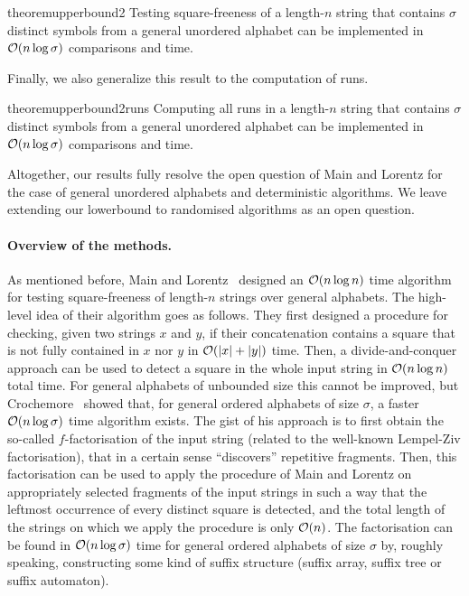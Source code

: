 \begin{restatable}{theorem}{upperbound2}
\label{thm:upperbound2}
Testing square-freeness of a length-$n$ string that contains $\sigma$ distinct symbols from a general unordered alphabet can be implemented in $\mathcal{O}(n\log \sigma)$ comparisons
and time.
\end{restatable}

Finally, we also generalize this result to the computation of runs.

\begin{restatable}{theorem}{upperbound2runs}
\label{thm:upperbound:runs}
Computing all runs in a length-$n$ string that contains $\sigma$ distinct symbols from a general unordered alphabet can be implemented in $\mathcal{O}(n\log \sigma)$ comparisons
and time.
\end{restatable}

Altogether, our results fully resolve the open question of Main and Lorentz for the case of general unordered alphabets and deterministic algorithms.
We leave extending our lowerbound to randomised algorithms as an open question.

\paragraph{Overview of the methods.}

As mentioned before, Main and Lorentz~\cite{Main1984} designed an $\mathcal{O}(n\log n)$ time algorithm for testing square-freeness of
length-$n$ strings over general alphabets. The high-level idea of their algorithm goes as follows. They first designed a procedure for checking,
given two strings $x$ and $y$, if their concatenation contains a square that is not fully contained in $x$ nor $y$ in $\mathcal{O}(\left\lvert x\right\rvert+\left\lvert y\right\rvert)$ time.
Then, a divide-and-conquer approach can be used to detect a square in the whole input string in $\mathcal{O}(n\log n)$ total time.
For general alphabets of unbounded size this cannot be improved, but Crochemore~\cite{Crochemore1986} showed that, for general
ordered alphabets of size $\sigma$, a faster $\mathcal{O}(n\log \sigma)$ time algorithm exists. The gist of his approach is to first obtain the so-called
$f$-factorisation of the input string (related to the well-known Lempel-Ziv factorisation), that in a certain sense ``discovers'' repetitive
fragments. Then, this factorisation can be used to apply the procedure of Main and Lorentz on appropriately selected fragments of the input
strings in such a way that the leftmost occurrence of every distinct square is detected, and the total length of the strings on which we apply the
procedure is only $\mathcal{O}(n)$. The factorisation can be found in $\mathcal{O}(n\log \sigma)$ time for general ordered alphabets of size $\sigma$ by,
roughly speaking, constructing some kind of suffix structure (suffix array, suffix tree or suffix automaton).

